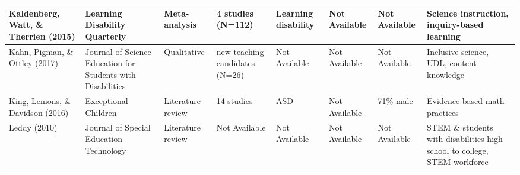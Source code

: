 \documentclass[11.5pt]{sig-alternate}
\begin{document}
\begin{@twocolumnfalse}
\begin{table}
\begin{tabular}{m{0.72in}m{0.72in}m{0.72in}m{0.72in}m{0.72in}m{0.72in}m{0.72in}m{0.72in}}
Kaldenberg, Watt, \& Therrien (2015)                    & Learning Disability Quarterly                                   & Meta-analysis                         & 4 studies (N=112)                                                                            & Learning disability                               &  \centering Not Available                                                                                          &  \centering Not Available                                                    & Science instruction, inquiry-based learning                                                              \\ \hline
Kahn, Pigman, \&  Ottley (2017)                      & Journal of Science Education for Students with Disabilities     & Qualitative                           & new teaching candidates (N=26)                                                               &  \centering Not Available                                     &  \centering Not Available                                                                                          &  \centering Not Available                                                    & Inclusive science, UDL, content knowledge                                                                \\ \hline
King, Lemons, \& Davidson (2016)                        & Exceptional Children                                            & Literature review                     & 14 studies                                                                                   & ASD                                               &  \centering Not Available                                                                                          & 71\% male                                                        & Evidence-based math practices                                                                           \hline  \\
Leddy (2010)                                            & Journal of Special Education Technology                         & Literature review                     &  \centering Not Available                                                                                &  \centering Not Available                                     &  \centering Not Available                                                                                          &  \centering Not Available                                                    & STEM \& students with disabilities high school to college, STEM workforce                               \hline  \\

\end{tabular}
\end{table}
\end{@twocolumnfalse}
\end{document}
